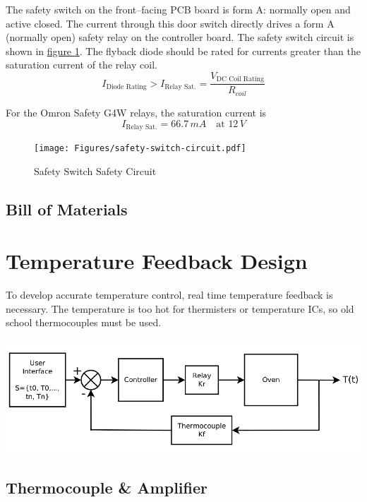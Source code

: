 \documentclass[10pt, twocolumn]{article}
\begin{document}
The safety switch on the front--facing PCB board is form A: normally open and active closed.
The current through this door switch directly drives a form A (normally open)
safety relay on the controller board. The safety switch circuit is shown in
\hyperref[safety-switch-circuit]{figure \ref{safety-switch-circuit}}.
The flyback diode should be rated for currents greater than the saturation
current of the relay coil.
\begin{equation}
I_{\textrm{Diode Rating}}>I_{\textrm{Relay Sat.}}=\frac{V_{\textrm{DC Coil Rating}}}{R_{coil}}
\end{equation}

For the Omron Safety G4W relays, the saturation current is
\begin{equation}
I_{\textrm{Relay Sat.}}=66.7\,mA\quad\textrm{at }12\,V
\end{equation}

\begin{figure}
	\centering
	\texttt{[image: Figures/safety-switch-circuit.pdf]}
	\caption{Safety Switch Safety Circuit}
	\label{safety-switch-circuit}
\end{figure}

\subsection{Bill of Materials}

\section{Temperature Feedback Design}

To develop accurate temperature control, real time temperature feedback
is necessary. The temperature is too hot for thermisters or temperature ICs,
so old school thermocouples must be used.

\begin{center}
	\includegraphics[width=\columnwidth]{Figures/control-system.pdf}
\end{center}

\subsection{Thermocouple \& Amplifier}
\end{document}
